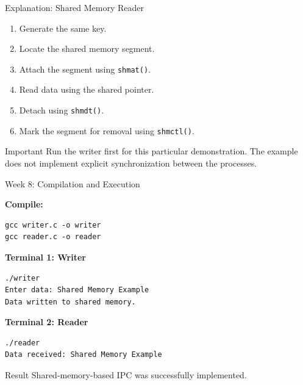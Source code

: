\documentclass[aspectratio=169,10pt]{beamer}
\begin{document}
\begin{frame}{Explanation: Shared Memory Reader}

\begin{enumerate}
    \item Generate the same key.
    \item Locate the shared memory segment.
    \item Attach the segment using \texttt{shmat()}.
    \item Read data using the shared pointer.
    \item Detach using \texttt{shmdt()}.
    \item Mark the segment for removal using
    \texttt{shmctl()}.
\end{enumerate}

\begin{alertblock}{Important}
Run the writer first for this particular
demonstration. The example does not implement
explicit synchronization between the processes.
\end{alertblock}

\end{frame}

\begin{frame}[fragile]{Week 8: Compilation and Execution}

\textbf{Compile:}

\begin{lstlisting}[style=terminal]
gcc writer.c -o writer
gcc reader.c -o reader
\end{lstlisting}

\textbf{Terminal 1: Writer}

\begin{lstlisting}[style=terminal]
./writer
Enter data: Shared Memory Example
Data written to shared memory.
\end{lstlisting}

\textbf{Terminal 2: Reader}

\begin{lstlisting}[style=terminal]
./reader
Data received: Shared Memory Example
\end{lstlisting}

\begin{block}{Result}
Shared-memory-based IPC was
successfully implemented.
\end{block}

\end{frame}
\end{document}
